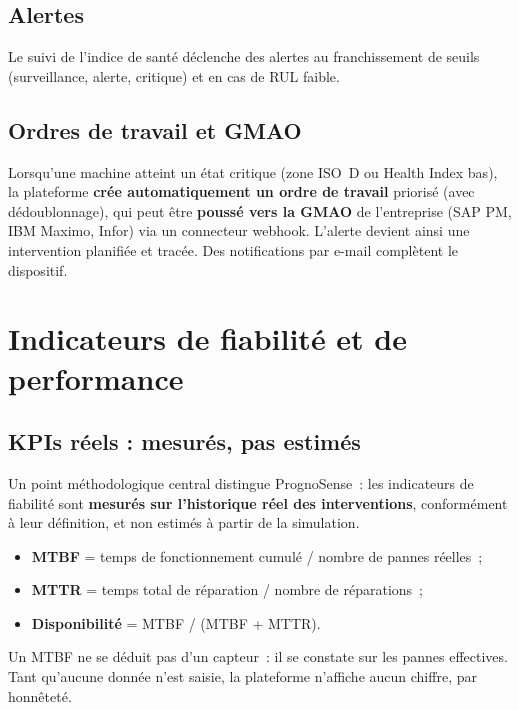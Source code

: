 \documentclass[12pt,a4paper]{article}
\begin{document}
\subsection{Alertes}
Le suivi de l'indice de santé déclenche des alertes au franchissement de seuils
(surveillance, alerte, critique) et en cas de RUL faible.

\subsection{Ordres de travail et GMAO}
Lorsqu'une machine atteint un état critique (zone ISO~D ou Health Index bas), la
plateforme \textbf{crée automatiquement un ordre de travail} priorisé (avec
dédoublonnage), qui peut être \textbf{poussé vers la GMAO} de l'entreprise (SAP PM,
IBM Maximo, Infor) via un connecteur webhook. L'alerte devient ainsi une intervention
planifiée et tracée. Des notifications par e-mail complètent le dispositif.

\begin{center}
\end{center}

\section{Indicateurs de fiabilité et de performance}

\subsection{KPIs réels : mesurés, pas estimés}
Un point méthodologique central distingue PrognoSense~: les indicateurs de fiabilité sont
\textbf{mesurés sur l'historique réel des interventions}, conformément à leur définition,
et non estimés à partir de la simulation.
\begin{itemize}[leftmargin=1.4em]
  \item \textbf{MTBF} = temps de fonctionnement cumulé / nombre de pannes réelles~;
  \item \textbf{MTTR} = temps total de réparation / nombre de réparations~;
  \item \textbf{Disponibilité} = MTBF / (MTBF + MTTR).
\end{itemize}
Un MTBF ne se déduit pas d'un capteur~: il se constate sur les pannes effectives. Tant
qu'aucune donnée n'est saisie, la plateforme n'affiche aucun chiffre, par honnêteté.
\end{document}
